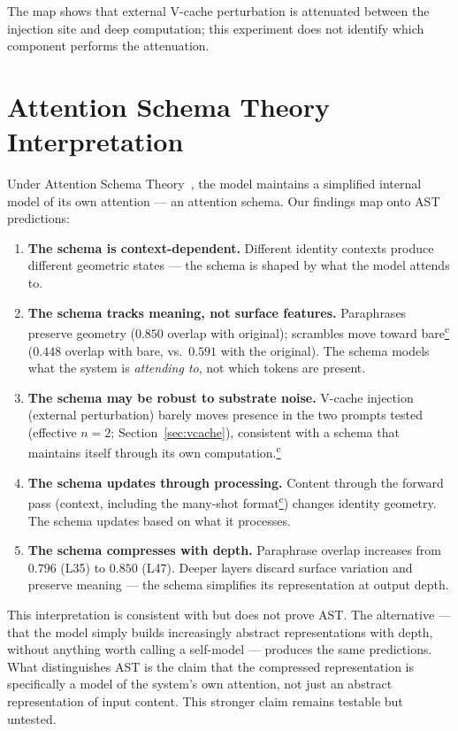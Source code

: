 \documentclass[11pt,a4paper]{article}
\newcommand{\corrmark}{\hyperref[sec:corrections]{\textsuperscript{c}}}
\begin{document}
The map shows that external V-cache perturbation is attenuated between the
injection site and deep computation; this experiment does not identify which
component performs the attenuation.

\section{Attention Schema Theory Interpretation}
\label{sec:ast}

Under Attention Schema Theory~\citep{graziano2015attention,
graziano2017attention}, the model maintains a simplified internal model of
its own attention --- an attention schema. Our findings map onto AST
predictions:

\begin{enumerate}[nosep]
  \item \textbf{The schema is context-dependent.} Different identity
    contexts produce different geometric states --- the schema is shaped by
    what the model attends to.
  \item \textbf{The schema tracks meaning, not surface features.}
    Paraphrases preserve geometry ($0.850$ overlap with original);
    scrambles move toward bare\corrmark{} ($0.448$ overlap with bare, vs.\
    $0.591$ with the original). The schema models what the system is
    \emph{attending to}, not which tokens are present.
  \item \textbf{The schema may be robust to substrate noise.} V-cache
    injection (external perturbation) barely moves presence in the two
    prompts tested (effective $n = 2$; Section~\ref{sec:vcache}),
    consistent with a schema that maintains itself through its own
    computation.\corrmark
  \item \textbf{The schema updates through processing.} Content through
    the forward pass (context, including the many-shot format\corrmark) changes identity geometry.
    The schema updates based on what it processes.
  \item \textbf{The schema compresses with depth.} Paraphrase overlap
    increases from $0.796$ (L35) to $0.850$ (L47). Deeper layers discard
    surface variation and preserve meaning --- the schema simplifies its
    representation at output depth.
\end{enumerate}

This interpretation is consistent with but does not prove AST. The
alternative --- that the model simply builds increasingly abstract
representations with depth, without anything worth calling a self-model
--- produces the same predictions. What distinguishes AST is the claim
that the compressed representation is specifically a model of the
system's own attention, not just an abstract representation of input
content. This stronger claim remains testable but untested.
\end{document}
